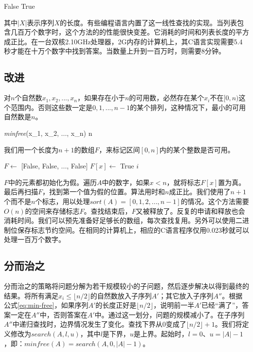 \documentclass[b5paper]{ctexart}
\begin{document}
\begin{algorithmic}[1]
      \State \Return False
    \EndIf
  \EndFor
  \State \Return True
\EndFunction
\end{algorithmic}

其中$|X|$表示序列$X$的长度。有些编程语言内置了这一线性查找的实现。当列表包含几百万个数字时，这个方法的的性能很快变差。它消耗的时间和列表长度的平方成正比。在一台双核2.10GHz处理器，2G内存的计算机上，其C语言实现需要5.4秒才能在十万个数字中找到答案。当数量上升到一百万时，则需要8分钟。

\subsection*{改进}
对$n$个自然数$x_1, x_2, ..., x_n$，如果存在小于$n$的可用数，必然存在某个$x_i$不在$[0, n)$这个范围内。否则这些数一定是$0, 1, ..., n - 1$的某个排列，这种情况下，最小的可用自然数是$n$。

\be
\textit{minfree}(x_1, x_2, ..., x_n) \leq n
\label{eq:min-free}
\ee

我们用一个长度为$n + 1$的数组$F$，来标记区间$[0, n]$内的某个整数是否可用。

\begin{algorithmic}[1]
  \State $F \gets$ [False, False, ..., False] 
      \State $F[x] \gets$ True
    \EndIf
  \EndFor
      \State \Return $i$
    \EndIf
  \EndFor
\EndFunction
\end{algorithmic}

$F$中的元素都初始化为假。遍历$A$中的数字，如果$x < n$，就将标志$F[x]$置为真。最后再扫描$F$，找到第一个值为假的位置。算法用时和$n$成正比。我们使用了$n + 1$个而不是$n$个标志，用以处理$sort(A) = [0, 1, 2, ..., n-1]$的情况。这个方法需要$O(n)$的空间来存储标志$F$。查找结束后，$F$又被释放了。反复的申请和释放也会消耗时间。我们可以预先准备好足够长的数组，每次查找复用。另外可以使用二进制位保存标志节约空间。在相同的计算机上，相应的C语言程序仅用0.023秒就可以处理一百万个数字。

\subsection*{分而治之}
分而治之的策略将问题分解为若干规模较小的子问题，然后逐步解决以得到最终的结果。将所有满足$x_i \leq \lfloor n/2 \rfloor$的自然数放入子序列$A'$；其它放入子序列$A''$。根据公式\ref{eq:min-free}，如果序列$A'$的长度正好是$\lfloor n/2 \rfloor$，说明前一半$A'$已经“满了”，答案一定在$A''$中，否则答案在$A'$中。通过这一划分，问题的规模减小了。在子序列$A''$中递归查找时，边界情况发生了变化。查找下界从0变成了$\lfloor n/2 \rfloor + 1$。我们将定义修改为$search(A, l, u)$，其中$l$是下界，$u$是上界。起始时，$l = 0$、$u = |A| - 1$，即：$minfree(A) = search(A, 0, |A|-1)$。
\end{document}
